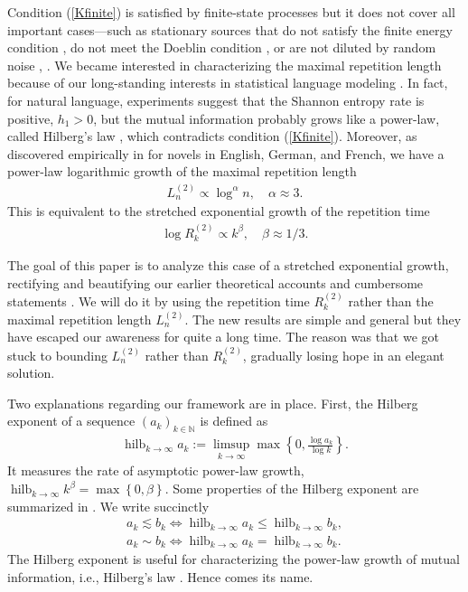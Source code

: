 \documentclass[a4paper]{article}
\newcommand{\klam}[1]{\left\{ #1 \right\}}
\DeclareMathOperator*{\hilberg}{hilb}
\begin{document}
Condition (\ref{Kfinite}) is satisfied by finite-state processes
\citep[Theorem 11.3]{Debowski21} but it does not cover all important
cases---such as stationary sources that do not satisfy the finite
energy condition \citep{Shields92b,Shields97}, do not meet the
Doeblin condition \citep[Theorem 11.7]{Debowski21}, or are not diluted
by random noise \citep{Shields97}, \citep[Theorem 11.6]{Debowski21}.
We became interested in characterizing the maximal repetition length
because of our long-standing interests in statistical language
modeling \citep{Debowski21}.  In fact, for natural language,
experiments suggest that the Shannon entropy rate is positive,
$h_1>0$, \citep{Shannon51,CoverKing78,BehrOthers03} but the mutual
information probably grows like a power-law, called Hilberg's law
\citep{Hilberg90, TakahiraOthers16, KaplanOther20, Debowski21}, which
contradicts condition (\ref{Kfinite}). Moreover, as discovered
empirically in \citep{Debowski12b,Debowski15f} for novels in English,
German, and French, we have a power-law logarithmic growth of the
maximal repetition length
\begin{align}
  L^{(2)}_n\propto \log^\alpha n,\quad \alpha\approx 3.
\end{align}
This is equivalent to the stretched exponential growth of the
repetition time
\begin{align}
  \log R^{(2)}_k\propto k^\beta,\quad \beta\approx 1/3.
\end{align}

The goal of this paper is to analyze this case of a stretched
exponential growth, rectifying and beautifying our earlier theoretical
accounts and cumbersome statements
\citep{Debowski15f,Debowski18b,Debowski21}. We will do it by using the
repetition time $R^{(2)}_k$ rather than the maximal repetition length
$L^{(2)}_n$. The new results are simple and general but they have
escaped our awareness for quite a long time. The reason was that we got
stuck to bounding $L^{(2)}_n$ rather than $R^{(2)}_k$, gradually
losing hope in an elegant solution.

Two explanations regarding our framework are in place.  First, the
Hilberg exponent of a sequence $(a_k)_{k\in\mathbb{N}}$ is defined as
\begin{align}
  \label{Exponent}
  \hilberg_{k\rightarrow\infty} a_k
  :=\limsup_{k\rightarrow\infty} \max\klam{0,\frac{\log
  a_k}{\log k}}
  .
\end{align}
It measures the rate of asymptotic power-law growth,
$\hilberg_{k\rightarrow\infty} k^\beta=\max\klam{0,\beta}$. Some
properties of the Hilberg exponent are summarized in \citep[Section
8.1]{Debowski21}. We write succinctly
\begin{align}
  a_k\lesssim b_k\iff
  \hilberg_{k\rightarrow\infty} a_k\le
  \hilberg_{k\rightarrow\infty} b_k,
  \\
  a_k\sim b_k\iff
  \hilberg_{k\rightarrow\infty} a_k=
  \hilberg_{k\rightarrow\infty} b_k.
\end{align}
The Hilberg exponent is useful for characterizing the power-law growth
of mutual information, i.e., Hilberg's law \citep[Chapter
8]{Debowski21}. Hence comes its name.
\end{document}
